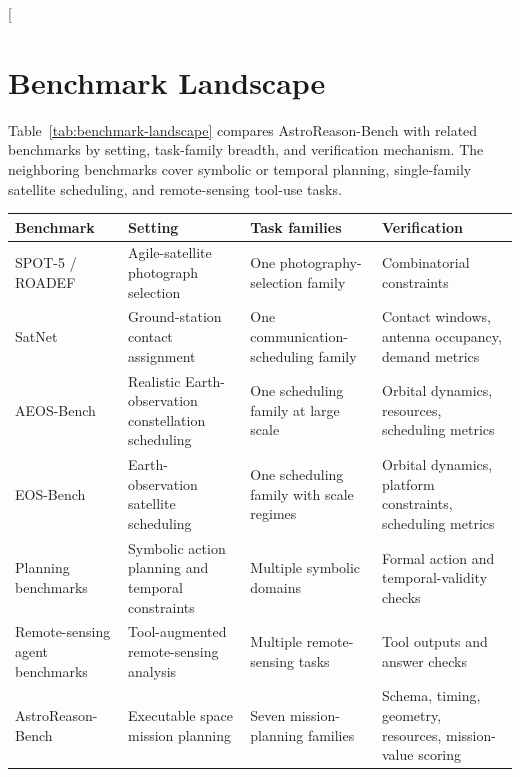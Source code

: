 \documentclass[11pt]{article}
\begin{document}


\clearpage
\appendix
\ifdefined\nolinenumbers\nolinenumbers\fi
\raggedbottom

\twocolumn[
\section{Benchmark Landscape}
\label{app:benchmark-landscape}

Table~\ref{tab:benchmark-landscape} compares AstroReason-Bench with related benchmarks by setting, task-family breadth, and verification mechanism. The neighboring benchmarks cover symbolic or temporal planning, single-family satellite scheduling, and remote-sensing tool-use tasks.

\begin{center}
\small
\setlength{\tabcolsep}{3.4pt}
\renewcommand{\arraystretch}{1.08}
\begin{tabular}{>{\raggedright\arraybackslash}p{}>{\raggedright\arraybackslash}p{}>{\raggedright\arraybackslash}p{}>{\raggedright\arraybackslash}p{}}
\hline
\rowcolor{headerrow}
\textbf{Benchmark} & \textbf{Setting} & \textbf{Task families} & \textbf{Verification} \\
\hline
\rowcolor{solverrow}
SPOT-5 / ROADEF \citep{lemaitrea2002selecting} & Agile-satellite photograph selection & One photography-selection family & Combinatorial constraints \\
\rowcolor{solverrow}
SatNet \citep{goh2021satnet} & Ground-station contact assignment & One communication-scheduling family & Contact windows, antenna occupancy, demand metrics \\
\rowcolor{solverrow}
AEOS-Bench \citep{wang2026aeosbench} & Realistic Earth-observation constellation scheduling & One scheduling family at large scale & Orbital dynamics, resources, scheduling metrics \\
\rowcolor{solverrow}
EOS-Bench \citep{yin2026eosbench} & Earth-observation satellite scheduling & One scheduling family with scale regimes & Orbital dynamics, platform constraints, scheduling metrics \\
\hline
\rowcolor{agentrow}
Planning benchmarks \citep{valmeekam2023planning,valmeekam2023planbench,ding2025tcp} & Symbolic action planning and temporal constraints & Multiple symbolic domains & Formal action and temporal-validity checks \\
\rowcolor{agentrow}
Remote-sensing agent benchmarks \citep{shabbir2025thinkgeo} & Tool-augmented remote-sensing analysis & Multiple remote-sensing tasks & Tool outputs and answer checks \\
\rowcolor{agentrow}
AstroReason-Bench & Executable space mission planning & Seven mission-planning families & Schema, timing, geometry, resources, mission-value scoring \\
\hline
\end{tabular}
\label{tab:benchmark-landscape}
\end{center}
\end{document}
